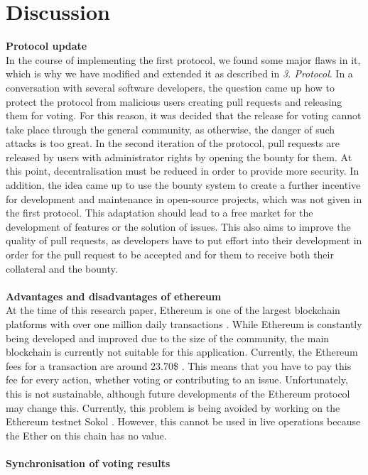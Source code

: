 \documentclass[sigconf]{acmart}
\begin{document}
\section{Discussion}
\textbf{Protocol update}\\
In the course of implementing the first protocol, we found some major flaws in it, which is why we have modified and extended it as 
described in \textit{3. Protocol}. In a conversation with several software developers, the question came up how to protect the protocol from 
malicious users creating pull requests and releasing them for voting.  For this reason, it was decided that the release for voting cannot take
 place through the general community, as otherwise, the danger of such attacks is too great. In the second iteration of the protocol, pull 
requests are released by users with administrator rights by opening the bounty for them. At this point, decentralisation must be reduced 
in order to provide more security. In addition, the idea came up to use the bounty system to create a further incentive for development and maintenance in open-source projects, which was not given in the first protocol. This adaptation should lead to a free market for the 
development of features or the solution of issues. This also aims to improve the quality of pull requests, as developers have to put effort 
into their development in order for the pull request to be accepted and for them to receive both their collateral and the bounty. \\ \\
\textbf{Advantages and disadvantages of ethereum}\\
At the time of this research paper, Ethereum is one of the largest blockchain platforms with over one million daily transactions \cite{eth2021scan}.
While Ethereum is constantly being developed and improved due to the size of the community, the main blockchain is currently not
suitable for this application. Currently, the Ethereum fees for a transaction are around 23.70\$ \cite{eth2021fees}. This means that you have to pay this 
fee for every action, whether voting or contributing to an issue. Unfortunately, this is not sustainable, although future developments 
of the Ethereum protocol may change this. Currently, this problem is being avoided by working on the Ethereum testnet Sokol \cite{eth2021sokol}. 
However, this cannot be used in live operations because the Ether on this chain has no value. \\ \\
\textbf{Synchronisation of voting results}\\
\end{document}
